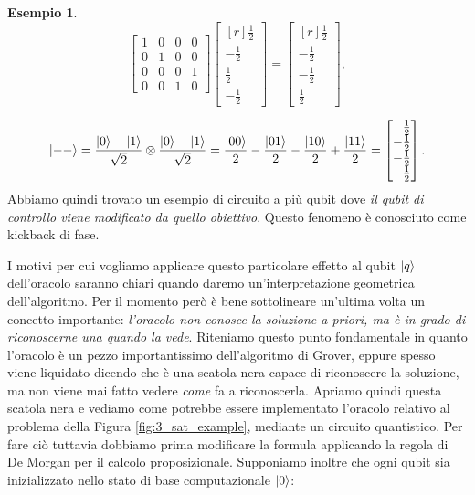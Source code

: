 \documentclass{book}
\theoremstyle{definition}
\theoremstyle{definition}
\theoremstyle{definition}
\newtheorem*{ex}{Esempio}
\theoremstyle{plain}
\theoremstyle{plain}
\theoremstyle{plain}
\theoremstyle{plain}
\begin{document}
\begin{ex}
\begin{displaymath}
\begin{bmatrix}
1 & 0 & 0 & 0\\
0 & 1 & 0 & 0\\
0 & 0 & 0 & 1\\
0 & 0 & 1 & 0
\end{bmatrix}
\begin{bmatrix*}[r]
\frac{1}{2} \\
-\frac{1}{2} \\
\frac{1}{2} \\
-\frac{1}{2}
\end{bmatrix*}
=
\begin{bmatrix*}[r]
\frac{1}{2} \\
-\frac{1}{2} \\
-\frac{1}{2} \\
\frac{1}{2}
\end{bmatrix*},
\end{displaymath}

\begin{displaymath}
\ket{--} = \frac{\ket{0}-\ket{1}}{\sqrt{2}} \otimes \frac{\ket{0}-\ket{1}}{\sqrt{2}} = \frac{\ket{00}}{2} - \frac{\ket{01}}{2} - \frac{\ket{10}}{2} + \frac{\ket{11}}{2} = 
\begin{bmatrix*}[r]
\frac{1}{2} \\
-\frac{1}{2} \\
-\frac{1}{2} \\
\frac{1}{2}
\end{bmatrix*}.
\end{displaymath}
Abbiamo quindi trovato un esempio di circuito a più qubit dove \emph{il qubit di controllo viene modificato da quello obiettivo}. Questo fenomeno è conosciuto come kickback di fase.
\end{ex}
I motivi per cui vogliamo applicare questo particolare effetto al qubit $\ket{q}$ dell'oracolo saranno chiari quando daremo un'interpretazione geometrica dell'algoritmo. Per il momento però è bene sottolineare un'ultima volta un concetto importante: \emph{l'oracolo non conosce la soluzione a priori, ma è in grado di riconoscerne una quando la vede}. Riteniamo questo punto fondamentale in quanto l'oracolo è un pezzo importantissimo dell'algoritmo di Grover, eppure spesso viene liquidato dicendo che è una scatola nera capace di riconoscere la soluzione, ma non viene mai fatto vedere \emph{come} fa a riconoscerla. Apriamo quindi questa scatola nera e vediamo come potrebbe essere implementato l'oracolo relativo al problema della Figura \ref{fig:3_sat_example}, mediante un circuito quantistico. Per fare ciò tuttavia dobbiamo prima modificare la formula applicando la regola di De Morgan per il calcolo proposizionale. Supponiamo inoltre che ogni qubit sia inizializzato nello stato di base computazionale $\ket{0}$:
\end{document}
